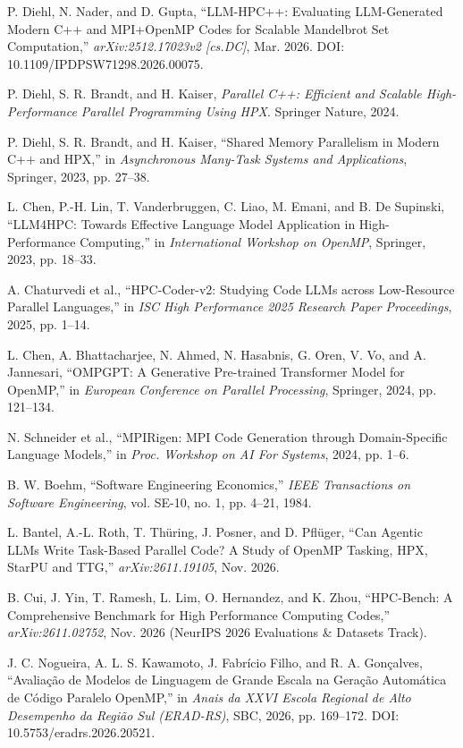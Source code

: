 P. Diehl, N. Nader, and D. Gupta, ``LLM-HPC++: Evaluating LLM-Generated Modern
C++ and MPI+OpenMP Codes for Scalable Mandelbrot Set Computation,''
\emph{arXiv:2512.17023v2 [cs.DC]}, Mar. 2026.
DOI: 10.1109/IPDPSW71298.2026.00075.

P. Diehl, S. R. Brandt, and H. Kaiser, \emph{Parallel C++: Efficient and Scalable
High-Performance Parallel Programming Using HPX}. Springer Nature, 2024.

P. Diehl, S. R. Brandt, and H. Kaiser, ``Shared Memory Parallelism in Modern C++
and HPX,'' in \emph{Asynchronous Many-Task Systems and Applications}, Springer,
2023, pp. 27--38.

L. Chen, P.-H. Lin, T. Vanderbruggen, C. Liao, M. Emani, and B. De Supinski,
``LLM4HPC: Towards Effective Language Model Application in High-Performance
Computing,'' in \emph{International Workshop on OpenMP}, Springer, 2023,
pp. 18--33.

A. Chaturvedi et al., ``HPC-Coder-v2: Studying Code LLMs across Low-Resource
Parallel Languages,'' in \emph{ISC High Performance 2025 Research Paper
Proceedings}, 2025, pp. 1--14.

L. Chen, A. Bhattacharjee, N. Ahmed, N. Hasabnis, G. Oren, V. Vo, and A. Jannesari,
``OMPGPT: A Generative Pre-trained Transformer Model for OpenMP,'' in
\emph{European Conference on Parallel Processing}, Springer, 2024, pp. 121--134.

N. Schneider et al., ``MPIRigen: MPI Code Generation through Domain-Specific
Language Models,'' in \emph{Proc. Workshop on AI For Systems}, 2024, pp. 1--6.

B. W. Boehm, ``Software Engineering Economics,'' \emph{IEEE Transactions on
Software Engineering}, vol. SE-10, no. 1, pp. 4--21, 1984.

L. Bantel, A.-L. Roth, T. Thüring, J. Posner, and D. Pflüger, ``Can Agentic LLMs
Write Task-Based Parallel Code? A Study of OpenMP Tasking, HPX, StarPU and TTG,''
\emph{arXiv:2611.19105}, Nov. 2026.

B. Cui, J. Yin, T. Ramesh, L. Lim, O. Hernandez, and K. Zhou, ``HPC-Bench: A
Comprehensive Benchmark for High Performance Computing Codes,''
\emph{arXiv:2611.02752}, Nov. 2026 (NeurIPS 2026 Evaluations \& Datasets Track).

J. C. Nogueira, A. L. S. Kawamoto, J. Fabrício Filho, and R. A. Gonçalves,
``Avaliação de Modelos de Linguagem de Grande Escala na Geração Automática de
Código Paralelo OpenMP,'' in \emph{Anais da XXVI Escola Regional de Alto Desempenho
da Região Sul (ERAD-RS)}, SBC, 2026, pp. 169--172.
DOI: 10.5753/eradrs.2026.20521.
